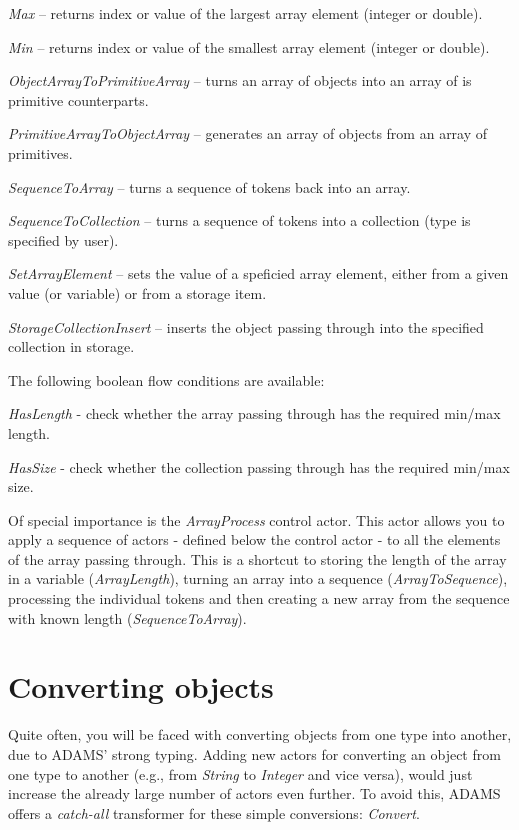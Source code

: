 \begin{tight_itemize}
	\item \textit{Max} -- returns index or value of the largest array element
	(integer or double).
	\item \textit{Min} -- returns index or value of the smallest array element
	(integer or double).
	\item \textit{ObjectArrayToPrimitiveArray} -- turns an array of objects
	into an array of is primitive counterparts.
	\item \textit{PrimitiveArrayToObjectArray} -- generates an array of objects
	from an array of primitives.
	\item \textit{SequenceToArray} -- turns a sequence of tokens back into an
	array.
	\item \textit{SequenceToCollection} -- turns a sequence of tokens into a
	collection (type is specified by user).
	\item \textit{SetArrayElement} -- sets the value of a speficied array 
	element, either from a given value (or variable) or from a storage item.
	\item \textit{StorageCollectionInsert} -- inserts the object passing through
	into the specified collection in storage.
\end{tight_itemize}
The following boolean flow conditions are available:
\begin{tight_itemize}
  \item \textit{HasLength} - check whether the array passing through has the required min/max length.
  \item \textit{HasSize} - check whether the collection passing through has the required min/max size.
\end{tight_itemize}
Of special importance is the \textit{ArrayProcess} control actor. This actor
allows you to apply a sequence of actors - defined below the control actor - to
all the elements of the array passing through. This is a shortcut to storing the
length of the array in a variable (\textit{ArrayLength}), turning an array into
a sequence (\textit{ArrayToSequence}), processing the individual tokens and then
creating a new array from the sequence with known length
(\textit{SequenceToArray}).

\newpage
\section{Converting objects}
\label{converting_objects}
Quite often, you will be faced with converting objects from one type into
another, due to ADAMS' strong typing. Adding new actors for converting an object
from one type to another (e.g., from \textit{String} to \textit{Integer} and 
vice versa), would just increase the already large number of actors even
further. To avoid this, ADAMS offers a \textit{catch-all} transformer for these
simple conversions: \textit{Convert}. 

